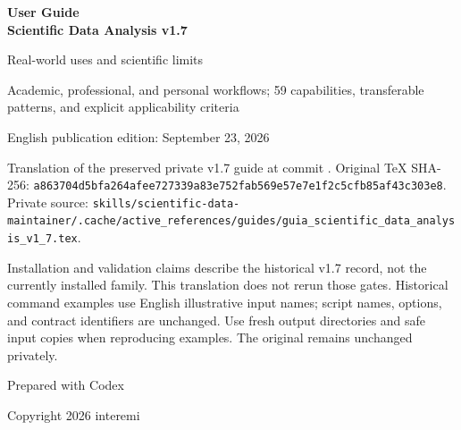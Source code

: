 \documentclass[11pt,a4paper]{article}
\newcommand{\code}[1]{\texttt{\detokenize{#1}}}
\begin{document}
\begin{titlepage}
\centering
\vspace*{1.0cm}
{\Huge\bfseries\color{titleblue} User Guide\\[0.15cm]
Scientific Data Analysis v1.7\par}
\vspace{0.65cm}
{\Large Real-world uses and scientific limits\par}
\vspace{0.8cm}
{\large Academic, professional, and personal workflows; 59 capabilities,
transferable patterns, and explicit applicability criteria\par}
\vspace{0.8cm}
{\large English publication edition: September 23, 2026\par}
\vspace{0.5cm}
\begin{minipage}{0.93\textwidth}
\small\raggedright
Translation of the preserved private v1.7 guide at commit \code{994eaea}.
Original TeX SHA-256:
\nolinkurl{a863704d5bfa264afee727339a83e752fab569e57e7e1f2c5cfb85af43c303e8}.
Private source:
\nolinkurl{skills/scientific-data-maintainer/.cache/active_references/guides/guia_scientific_data_analysis_v1_7.tex}.

Installation and validation claims describe the historical v1.7 record,
not the currently installed family. This translation does not rerun those
gates. Historical command examples use English illustrative input names;
script names, options, and contract identifiers are unchanged. Use fresh
output directories and safe input copies when reproducing examples.
The original remains unchanged privately.
\end{minipage}
\vfill
{\large Prepared with Codex\par}
{\large Copyright 2026 interemi\par}
\end{titlepage}

\clearpage
{}
\begin{abstract}
\code{scientific-data-analysis} began with a strong focus on astronomy,
FITS, notebooks, LaTeX, data reduction, and scientific reporting. v1.7
extends its usefulness to academic, professional, and personal work while
preserving that foundation. A capability may be general-purpose, transfer
a pattern, remain domain-specific, be legacy, or serve maintainers only.
Analogies are not forced when a tool does not apply.

The original guide records the installed v1.7 state after final
synchronization and post-sync validation. The audited technical baseline
remains v1.6; v1.7 adds documentation, regressions, and focused fixes to
clarify what to use, what to avoid, and how to choose the next step.
\end{abstract}
\tableofcontents
\newpage
{}
\end{document}
